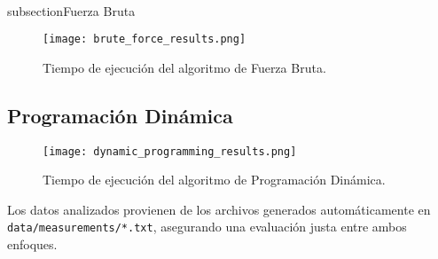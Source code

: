 \\subsection{Fuerza Bruta}
\begin{figure}[h]
    \centering
    \texttt{[image: brute\_force\_results.png]}
    \caption{Tiempo de ejecución del algoritmo de Fuerza Bruta.}
\end{figure}

\subsection{Programación Dinámica}
\begin{figure}[h]
    \centering
    \texttt{[image: dynamic\_programming\_results.png]}
    \caption{Tiempo de ejecución del algoritmo de Programación Dinámica.}
\end{figure}

Los datos analizados provienen de los archivos generados automáticamente en \texttt{data/measurements/*.txt}, asegurando una evaluación justa entre ambos enfoques.

